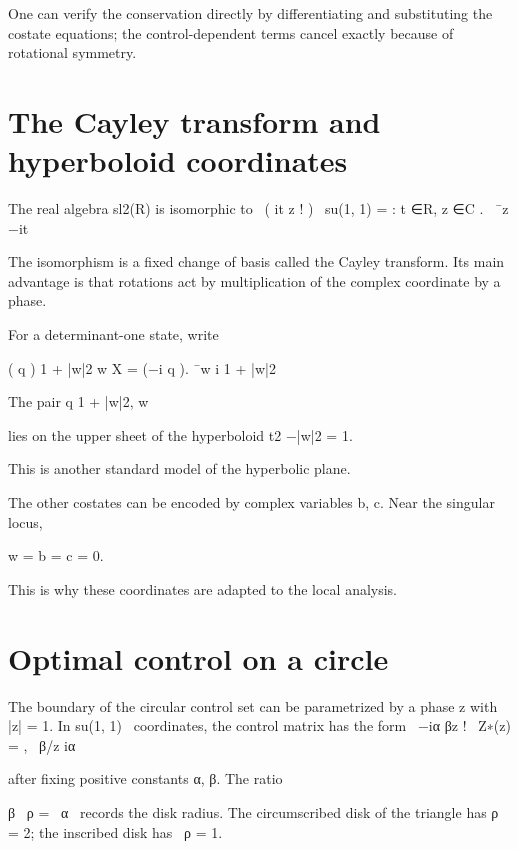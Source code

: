 One can verify the conservation directly by differentiating and substituting the costate equations; the control-dependent terms cancel exactly because of rotational symmetry.


\section{The Cayley transform and hyperboloid coordinates}

\begin{displaytext}
The real algebra sl2(R) is isomorphic to \
( it z ! ) \
su(1, 1) = : t ∈R, z ∈C . \
¯z −it
\end{displaytext}

The isomorphism is a fixed change of basis called the Cayley transform. Its main advantage is that rotations act by multiplication of the complex coordinate by a phase.


For a determinant-one state, write


( q ) 1 + |w|2 w X = (−i q ). ¯w i 1 + |w|2


The pair q 1 + |w|2, w


lies on the upper sheet of the hyperboloid t2 −|w|2 = 1.


This is another standard model of the hyperbolic plane.


The other costates can be encoded by complex variables b, c. Near the singular locus,


\begin{displaytext}
w = b = c = 0.
\end{displaytext}

This is why these coordinates are adapted to the local analysis.


\section{Optimal control on a circle}

\begin{displaytext}
The boundary of the circular control set can be parametrized by a phase z with |z| = 1. In su(1, 1) \
coordinates, the control matrix has the form \
−iα βz ! \
Z∗(z) = , \
β/z iα
\end{displaytext}

after fixing positive constants α, β. The ratio


\begin{displaytext}
β \
ρ = \
α \
records the disk radius. The circumscribed disk of the triangle has ρ = 2; the inscribed disk has \
ρ = 1.
\end{displaytext}

